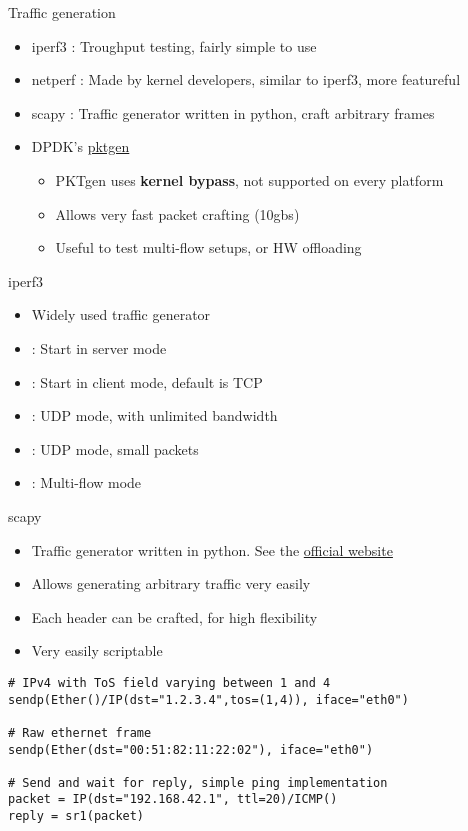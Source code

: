 \begin{frame}{Traffic generation}
	\begin{itemize}
		\item iperf3 : Troughput testing, fairly simple to use
		\item netperf : Made by kernel developers, similar to iperf3, more featureful
		\item scapy : Traffic generator written in python, craft arbitrary frames
		\item DPDK's \href{https://pktgen-dpdk.readthedocs.io/en/latest/}{pktgen}
			\begin{itemize}
				\item PKTgen uses \textbf{kernel bypass}, not supported on every platform
				\item Allows very fast packet crafting (10gbs)
				\item Useful to test multi-flow setups, or HW offloading
			\end{itemize}
	\end{itemize}
\end{frame}

\begin{frame}{iperf3}
	\begin{itemize}
		\item Widely used traffic generator
		\item {} : Start in server mode
		\item {} : Start in client mode, default is TCP
		\item {} : UDP mode, with unlimited bandwidth
		\item {} : UDP mode, small packets
		\item {} : Multi-flow mode
	\end{itemize}
\end{frame}

\begin{frame}[fragile]{scapy}
	\begin{itemize}
		\item Traffic generator written in python. See the \href{https://scapy.net/}{official website}
		\item Allows generating arbitrary traffic very easily
		\item Each header can be crafted, for high flexibility
		\item Very easily scriptable
	\end{itemize}
	\begin{verbatim}
# IPv4 with ToS field varying between 1 and 4
sendp(Ether()/IP(dst="1.2.3.4",tos=(1,4)), iface="eth0")

# Raw ethernet frame
sendp(Ether(dst="00:51:82:11:22:02"), iface="eth0") 

# Send and wait for reply, simple ping implementation
packet = IP(dst="192.168.42.1", ttl=20)/ICMP()
reply = sr1(packet) 	\end{verbatim}
\end{frame}

